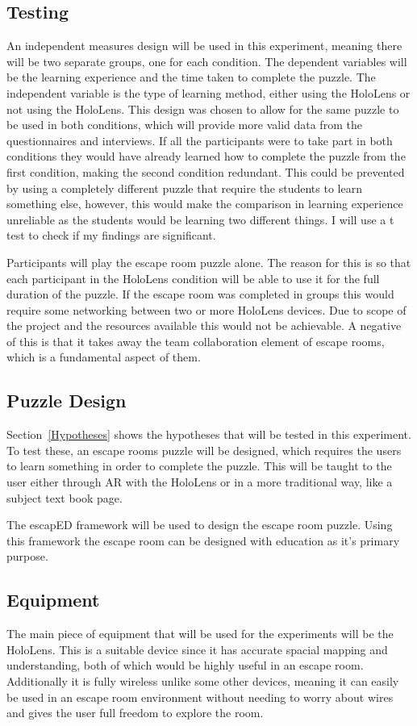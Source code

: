 \documentclass[journal]{IEEEtran}
\begin{document}
\subsection{Testing}
An independent measures design will be used in this experiment, meaning there will be two separate groups, one for each condition. The dependent variables will be the learning experience and the time taken to complete the puzzle. The independent variable is the type of learning method, either using the HoloLens or not using the HoloLens. This design was chosen to allow for the same puzzle to be used in both conditions, which will provide more valid data from the questionnaires and interviews. If all the participants were to take part in both conditions they would have already learned how to complete the puzzle from the first condition, making the second condition redundant. This could be prevented by using a completely different puzzle that require the students to learn something else, however, this would make the comparison in learning experience unreliable as the students would be learning two different things. I will use a t test to check if my findings are significant.  

Participants will play the escape room puzzle alone. The reason for this is so that each participant in the HoloLens condition will be able to use it for the full duration of the puzzle. If the escape room was completed in groups this would require some networking between two or more HoloLens devices. Due to scope of the project and the resources available this would not be achievable. A negative of this is that it takes away the team collaboration element of escape rooms, which is a fundamental aspect of them. 

\subsection{Puzzle Design}
Section~\ref{Hypotheses} shows the hypotheses that will be tested in this experiment. To test these, an escape rooms puzzle will be designed, which requires the users to learn something in order to complete the puzzle. This will be taught to the user either through AR with the HoloLens or in a more traditional way, like a subject text book page. 

The escapED framework \cite{clarke_escaped:_2017} will be used to design the escape room puzzle. Using this framework the escape room can be designed with education as it's primary purpose.

\subsection{Equipment}
The main piece of equipment that will be used for the experiments will be the HoloLens. This is a suitable device since it has accurate spacial mapping and understanding, both of which would be highly useful in an escape room. Additionally it is fully wireless unlike some other devices, meaning it can easily be used in an escape room environment without needing to worry about wires and gives the user full freedom to explore the room.
\end{document}
